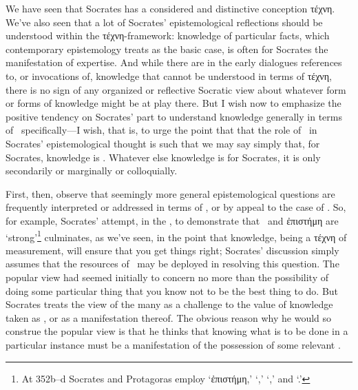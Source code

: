 \documentclass[11pt,letterpaper,oneside]{amsart} %
\begin{document}

		
We have seen that Socrates has a considered and distinctive conception τέχνη. We've also seen that a lot of Socrates' epistemological reflections should be understood within the τέχνη-framework: knowledge of particular facts, which contemporary epistemology treats as the basic case, is often for Socrates the manifestation of expertise. And while there are in the early dialogues references to, or invocations of, knowledge that cannot be understood in terms of τέχνη, there is no sign of any organized or reflective Socratic view about whatever form or forms of knowledge might be at play there. But I wish now to emphasize the positive tendency on Socrates' part to understand knowledge generally in terms of \techne\ specifically---I wish, that is, to urge the point that that the role of \techne\ in Socrates' epistemological thought is such that we may say simply that, for Socrates, knowledge is \techne. Whatever else knowledge is for Socrates, it is only secondarily or marginally or colloquially.

First, then, observe that seemingly more general epistemological questions are frequently interpreted or addressed in terms of \techne, or by appeal to the case of \techne. So, for example,  Socrates' attempt, in the \prot, to demonstrate that \sophia\ and ἐπιστήμη are `strong'\footnote{At 352b--d Socrates and Protagoras employ `ἐπιστήμη,' `\phronesis,' `\sophia,' and `\gignoskein.'} culminates, as we've seen, in the point that knowledge, being a τέχνη of measurement, will ensure that you get things right; Socrates' discussion simply assumes that the resources of \techne\ may be deployed in resolving this question. The popular view had seemed initially to concern no more than the possibility of doing some particular thing that you know not to be the best thing to do. But Socrates treats the view of the many as a challenge to the value of knowledge taken as \techne, or as a manifestation thereof. The obvious reason why he would so construe the popular view is that he thinks that knowing what is to be done in a particular instance must be a manifestation of the possession of some relevant \techne.




 
\end{document}
